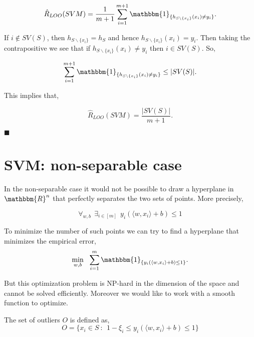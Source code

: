 \documentclass[a4paper,english,12pt]{article}
\begin{document}
\begin{equation}
\hat{R}_{LOO}(SVM) = \frac{1}{m+1} \sum_{i = 1}^{m+1} \mathbbm{1}_{\{h_{S \backslash \{x_i\}}(x_i) \neq y_i\}}.
\end{equation}

If $i \not\in SV(S)$, then  $h_{S \backslash \{x_i\}} =  h _S$ and hence $ h_{S \backslash \{x_i\}}(x_i) = y_i$. Then taking the contrapositive we see that if  $h_{S \backslash \{x_i\}}(x_i) \neq y_i$ then $i \in SV(S)$. So,

\begin{equation}
\sum_{i = 1}^{m+1} \mathbbm{1}_{\{h_{S \backslash \{x_i\}}(x_i) \neq y_i\}} \leq |SV(S)|. 
\end{equation}

This implies that,

\begin{equation}
\hat{R}_{LOO}(SVM) = \frac{|SV(S)|}{m+1}. 
\end{equation} 

\begin{flushright}
$\blacksquare$
\end{flushright}

\section*{SVM: non-separable case}

In the non-separable case it would not be possible to draw a hyperplane in $\mathbbm{R}^n$ that perfectly separates the two sets of points. More precisely,

\begin{equation}
\forall_{w,b}~~\exists_{i \in [m]} ~~y_i( \langle w, x_i \rangle + b) \leq 1
\end{equation}

To minimize the number of such points we can try to find a hyperplane that  minimizes the empirical error, $$ \mathop{\min}_{w,b} ~~\sum_{i =1}^{m} \mathbbm{1}_{\{ y_i( \langle w, x_i \rangle + b) \leq 1 \}}. $$

But this optimization problem is NP-hard in the dimension of the space and cannot be solved efficiently. Moreover we would like to work with a smooth function to optimize.

\begin{defn}[Outliers]

The set of outliers $O$ is defined as,
$$ O =  \{ x_i \in S ~ :~~ 1 - \xi_i \leq  y_i( \langle w, x_i \rangle + b) \leq 1  \}$$
\end{defn}
\end{document}
